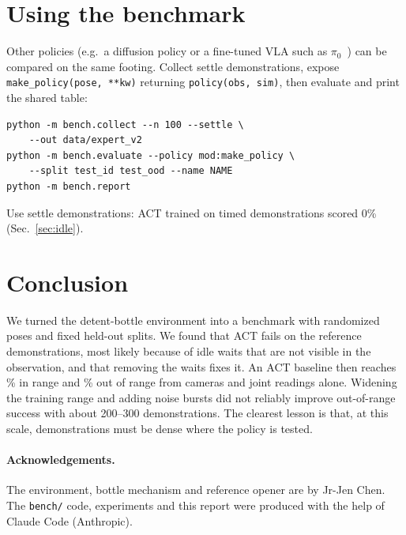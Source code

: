 \documentclass[10pt,twocolumn,letterpaper]{article}
\newcommand{\ttt}[1]{\texttt{\small #1}}
\begin{document}
\section{Using the benchmark}
Other policies (e.g.\ a diffusion policy or a fine-tuned VLA such as $\pi_0$~\cite{pi0}) can be compared on
the same footing. Collect settle demonstrations, expose \ttt{make\_policy(pose, **kw)} returning
\ttt{policy(obs, sim)}, then evaluate and print the shared table:
{\scriptsize
\begin{verbatim}
python -m bench.collect --n 100 --settle \
    --out data/expert_v2
python -m bench.evaluate --policy mod:make_policy \
    --split test_id test_ood --name NAME
python -m bench.report
\end{verbatim}}
Use settle demonstrations: ACT trained on timed demonstrations scored 0\% (Sec.~\ref{sec:idle}).

\section{Conclusion}
We turned the detent-bottle environment into a benchmark with randomized poses and fixed held-out splits. We
found that ACT fails on the reference demonstrations, most likely because of idle waits that are not visible
in the observation, and that removing the waits fixes it. An ACT baseline then reaches \VtwoId\% in range and \VtwoOod\% out of range from cameras and
joint readings alone. Widening the training range and adding noise bursts did not reliably improve
out-of-range success with about 200--300 demonstrations. The clearest lesson is that, at this scale,
demonstrations must be dense where the policy is tested.

\paragraph{Acknowledgements.} The environment, bottle mechanism and reference opener are by Jr-Jen Chen. The
\ttt{bench/} code, experiments and this report were produced with the help of Claude Code (Anthropic).
\end{document}
